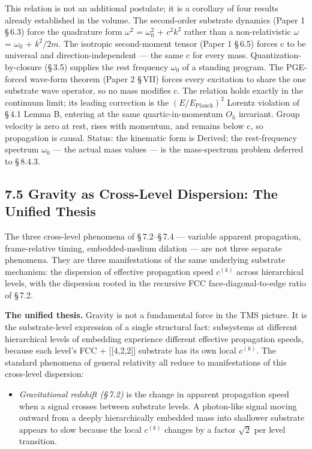 \documentclass[11pt,oneside]{report}
\theoremstyle{definition}
\theoremstyle{remark}
\begin{document}
This relation is not an additional postulate; it is a corollary of four
results already established in the volume. The second-order substrate
dynamics (Paper 1 \S\,6.3) force the quadrature form \ensuremath{\omega^{2}} = \ensuremath{\omega^{2}_{0}} + \ensuremath{c^{2}k^{2}} rather
than a non-relativistic \ensuremath{\omega} = \ensuremath{\omega_{0}} + \ensuremath{k^{2}/2m.} The isotropic second-moment
tensor (Paper 1 \S\,6.5) forces c to be universal and direction-independent
--- the same c for every mass. Quantization-by-closure (\S\,3.5) supplies
the rest frequency \ensuremath{\omega_{0}} of a standing program. The PGE-forced wave-form
theorem (Paper 2 \S\,VII) forces every excitation to share the one
substrate wave operator, so no mass modifies c. The relation holds
exactly in the continuum limit; its leading correction is the
\ensuremath{(E/E_{\mathrm{Planck}})^{2}} Lorentz violation of \S\,4.1 Lemma B, entering at the same
quartic-in-momentum \ensuremath{O_{h}} invariant. Group velocity is zero at rest,
rises with momentum, and remains below c, so propagation is causal.
Status: the kinematic form is Derived; the rest-frequency spectrum \ensuremath{\omega_{0}}
--- the actual mass values --- is the mass-spectrum problem deferred to
\S\,8.4.3.

\subsection*{7.5 Gravity as Cross-Level Dispersion: The Unified Thesis}

The three cross-level phenomena of \S\,7.2--\S\,7.4 --- variable apparent
propagation, frame-relative timing, embedded-medium dilation --- are not
three separate phenomena. They are three manifestations of the same
underlying substrate mechanism: the dispersion of effective propagation
speed \ensuremath{c^{(k)}} across hierarchical levels, with the dispersion rooted in the
recursive FCC face-diagonal-to-edge ratio of \S\,7.2.

\textbf{The unified thesis.} Gravity is not a fundamental force in the
TMS picture. It is the substrate-level expression of a single structural
fact: subsystems at different hierarchical levels of embedding
experience different effective propagation speeds, because each level's
FCC + [[4,2,2]] substrate has its own local \ensuremath{c^{(k)}.} The standard
phenomena of general relativity all reduce to manifestations of this
cross-level dispersion:

\begin{itemize}
\item
  \emph{Gravitational redshift (\S\,7.2)} is the change in apparent
  propagation speed when a signal crosses between substrate levels. A
  photon-like signal moving outward from a deeply hierarchically
  embedded mass into shallower substrate appears to slow because the
  local \ensuremath{c^{(k)}} changes by a factor \ensuremath{\sqrt{2}} per level transition.
\end{itemize}
\end{document}
